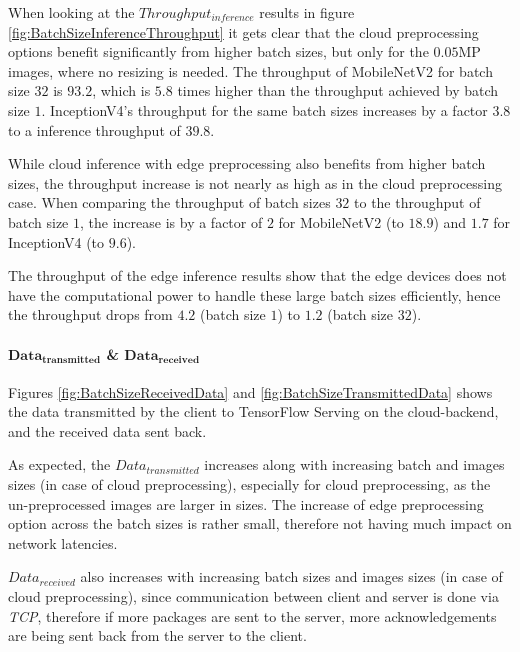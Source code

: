 When looking at the $Throughput_{inference}$ results in figure \ref{fig:BatchSizeInferenceThroughput} it gets clear that the cloud preprocessing options benefit significantly from higher batch sizes, but only for the $0.05$MP images, where no resizing is needed.
The throughput of MobileNetV2 for batch size $32$ is $93.2$, which is $5.8$ times higher than the throughput achieved by batch size $1$. 
InceptionV4's throughput for the same batch sizes increases by a factor $3.8$ to a inference throughput of $39.8$.

While cloud inference with edge preprocessing also benefits from higher batch sizes, the throughput increase is not nearly as high as in the cloud preprocessing case.
When comparing the throughput of batch sizes $32$ to the throughput of batch size $1$, the increase is by a factor of $2$ for MobileNetV2 (to $18.9$) and $1.7$ for InceptionV4 (to $9.6$).

The throughput of the edge inference results show that the edge devices does not have the computational power to handle these large batch sizes efficiently, hence the throughput drops from $4.2$ (batch size $1$) to $1.2$ (batch size $32$).


\paragraph{$\mathbf{Data_{transmitted}}$ \& $\mathbf{Data_{received}}$}
Figures \ref{fig:BatchSizeReceivedData} and \ref{fig:BatchSizeTransmittedData} shows the data transmitted by the client to TensorFlow Serving on the cloud-backend, and the received data sent back.

As expected, the $Data_{transmitted}$ increases along with increasing batch and images sizes (in case of cloud preprocessing), especially for cloud preprocessing, as the un-preprocessed images are larger in sizes.
The increase of edge preprocessing option across the batch sizes is rather small, therefore not having much impact on network latencies.

$Data_{received}$ also increases with increasing batch sizes and images sizes (in case of cloud preprocessing), since communication between client and server is done via \emph{TCP}, therefore if more packages are sent to the server, more acknowledgements are being sent back from the server to the client.


